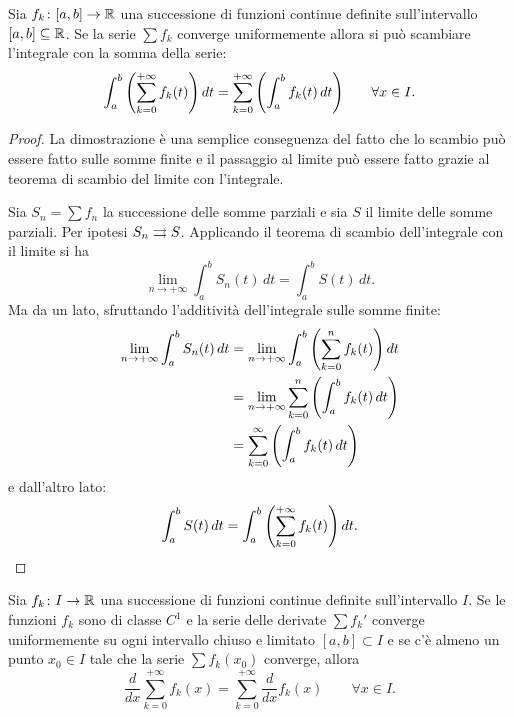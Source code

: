 \begin{theorem}
\label{th:integrale_serie}
\mymark{**}%
%
%
%
%
Sia $f_k\colon [a,b]\to{\mathbb R}$ una successione di funzioni continue definite sull'intervallo $[a,b]\subseteq {\mathbb R}$.
Se la serie $\sum f_k$ converge uniformemente
allora si può scambiare l'integrale con la somma della serie:
\[
  \int_a^b {\left( \sum_{k=0}^{+\infty} f_k(t) \right)}\, dt
  = \sum_{k=0}^{+\infty} {\left( \int_a^b f_k(t)\, dt \right)}
  \qquad \forall x \in I.
\]
\end{theorem}
\begin{proof}
\mymark{**}
La dimostrazione è una semplice conseguenza del fatto che lo scambio 
può essere fatto sulle somme finite e il passaggio al limite 
può essere fatto grazie al teorema di scambio del limite con l'integrale.

Sia $S_n = \sum f_n$ la successione delle somme parziali e sia $S$ 
il limite delle somme parziali. Per ipotesi $S_n\rightrightarrows S$. 
Applicando il teorema di scambio dell'integrale con il limite si ha
\[
  \lim_{n\to +\infty} \int_a^b S_n(t)\, dt = \int_a^b S(t)\, dt.
\]
Ma da un lato, sfruttando l'additività dell'integrale sulle somme finite:
\begin{align*}
  \lim_{n\to +\infty} \int_a^b S_n(t)\, dt
   &= \lim_{n\to+\infty}\int_a^b {\left( \sum_{k=0}^n f_k(t) \right)} \,  dt\\
   &= \lim_{n\to+\infty}\sum_{k=0}^n {\left( \int_a^b f_k(t)\, dt \right)}\\
   &= \sum_{k=0}^\infty {\left( \int_a^b f_k(t)\, dt \right)}
\end{align*}
e dall'altro lato:
\[
  \int_a^b S(t)\, dt = \int_a^b {\left( \sum_{k=0}^{+\infty} f_k(t) \right)}\, dt.
\]
\end{proof}

\begin{theorem}
\mymark{**}
Sia $f_k\colon I\to{\mathbb R}$ una successione di funzioni continue definite sull'intervallo $I$. 
Se le funzioni $f_k$ sono di classe $C^1$ e la serie delle derivate $\sum f_k'$ converge uniformemente
su ogni intervallo chiuso e limitato $[a,b]\subset I$
e se c'è almeno un punto $x_0\in I$ tale che la serie
$\sum f_k(x_0)$ converge, allora
\[
  \frac{d}{dx} \sum_{k=0}^{+\infty} f_k(x) = \sum_{k=0}^{+\infty} \frac{d}{dx}f_k(x)
  \qquad \forall x \in I.
\]
\end{theorem}


